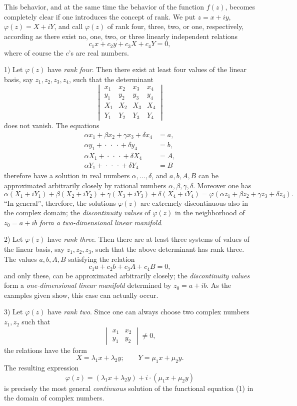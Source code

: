\documentclass[11pt]{article}
\begin{document}
This behavior, and at the same time the behavior of the function \(f(z)\), becomes completely clear if one introduces the concept of rank. We put \(z=x+iy\), \(\varphi(z)=X+iY\), and call \(\varphi(z)\) of rank four, three, two, or one, respectively, according as there exist no, one, two, or three linearly independent relations
\[
c_1x+c_2y+c_3X+c_4Y=0,
\]
where of course the \(c\)'s are real numbers.

1) Let \(\varphi(z)\) have \emph{rank four}. Then there exist at least four values of the linear basis, say \(z_1,z_2,z_3,z_4\), such that the determinant
\[
\begin{vmatrix}
x_1&x_2&x_3&x_4\\
y_1&y_2&y_3&y_4\\
X_1&X_2&X_3&X_4\\
Y_1&Y_2&Y_3&Y_4
\end{vmatrix}
\]
does not vanish. The equations
\[
\begin{aligned}
\alpha x_1+\beta x_2+\gamma x_3+\delta x_4&=a,\\
\alpha y_1+{}\cdot{}\ \cdot{}\ \cdot{}+\delta y_4&=b,\\
\alpha X_1+{}\cdot{}\ \cdot{}\ \cdot{}+\delta X_4&=A,\\
\alpha Y_1+{}\cdot{}\ \cdot{}\ \cdot{}+\delta Y_4&=B
\end{aligned}
\]
therefore have a solution in real numbers \(\alpha,\ldots,\delta\), and \(a,b,A,B\) can be approximated arbitrarily closely by rational numbers \(\alpha,\beta,\gamma,\delta\). Moreover one has
\[
\alpha(X_1+iY_1)+\beta(X_2+iY_2)+\gamma(X_3+iY_3)+\delta(X_4+iY_4)
 =\varphi(\alpha z_1+\beta z_2+\gamma z_3+\delta z_4).
\]
``In general'', therefore, the solutions \(\varphi(z)\) are extremely discontinuous also in the complex domain; the \emph{discontinuity values} of \(\varphi(z)\) in the neighborhood of \(z_0=a+ib\) \emph{form a two-dimensional linear manifold}.

2) Let \(\varphi(z)\) have \emph{rank three}. Then there are at least three systems of values of the linear basis, say \(z_1,z_2,z_3\), such that the above determinant has rank three. The values \(a,b,A,B\) satisfying the relation
\[
c_1a+c_2b+c_3A+c_4B=0,
\]
and only these, can be approximated arbitrarily closely; the \emph{discontinuity values} form a \emph{one-dimensional linear manifold} determined by \(z_0=a+ib\). As the examples given show, this case can actually occur.

3) Let \(\varphi(z)\) have \emph{rank two}. Since one can always choose two complex numbers \(z_1,z_2\) such that
\[
\begin{vmatrix}x_1&x_2\\ y_1&y_2\end{vmatrix}\ne0,
\]
the relations have the form
\[
X=\lambda_1x+\lambda_2y;\qquad Y=\mu_1x+\mu_2y.
\]
The resulting expression
\[
\varphi(z)=(\lambda_1x+\lambda_2y)+i\cdot(\mu_1x+\mu_2y)
\]
is precisely the most general \emph{continuous} solution of the functional equation (1) in the domain of complex numbers.
\end{document}
